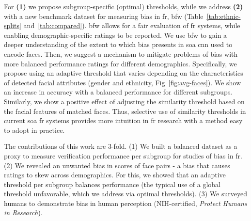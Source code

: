     
    For \textbf{(1)} we propose subgroup-specific (\ie optimal) thresholds, while we address \textbf{(2)} with a new benchmark dataset for measuring bias in \gls{fr}, \gls{bfw} (Table~\ref{tab:ethnic-splits} and~\ref{tab:compared}). \gls{bfw} allows for a fair evaluation of \gls{fr} systems, while enabling demographic-specific ratings to be reported. We use \gls{bfw} to gain a deeper understanding of the extent to which bias presents in \gls{soa} \gls{cnn} used to encode faces. Then, we suggest a mechanism to mitigate problems of bias with more balanced performance ratings for different demographics. Specifically, we propose using an adaptive threshold that varies depending on the characteristics of detected facial attributes (\ie gender and ethnicity, Fig~\ref{fig:avg-faces}). We show an increase in accuracy with a balanced performance for different subgroups. Similarly, we show a positive effect of adjusting the similarity threshold based on the facial features of matched faces. Thus, selective use of similarity thresholds in current \gls{soa} \gls{fr} systems provides more intuition in \gls{fr} research with a method easy to adopt in practice. 
    
    
    The contributions of this work are 3-fold. (1) We built a balanced dataset as a proxy to measure verification performance per subgroup for studies of bias in \gls{fr}. (2) We revealed an unwanted bias in scores of face pairs - a bias that causes ratings to skew across demographics. For this, we showed that an adaptive threshold per subgroup balances performance (\ie the typical use of a global threshold unfavorable, which we address via optimal thresholds). (3) We surveyed humans to demonstrate bias in human perception (NIH-certified, \textit{Protect Humans in Research}).%

